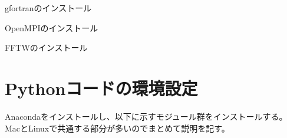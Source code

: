 \documentclass[letterpaper,10pt,dvipdfmx,report]{sphinxmanual}
\begin{document}
\sphinxAtStartPar
gfortranのインストール

\begin{sphinxVerbatim}[commandchars=\\\{\}]
   
\end{sphinxVerbatim}

\sphinxAtStartPar
OpenMPIのインストール

\begin{sphinxVerbatim}[commandchars=\\\{\}]
     
\end{sphinxVerbatim}

\sphinxAtStartPar
FFTWのインストール

\begin{sphinxVerbatim}[commandchars=\\\{\}]
   
\end{sphinxVerbatim}


\section{Pythonコードの環境設定}
\label{\detokenize{environment:python}}
\sphinxAtStartPar
Anacondaをインストールし、以下に示すモジュール群をインストールする。
MacとLinuxで共通する部分が多いのでまとめて説明を記す。
\end{document}
